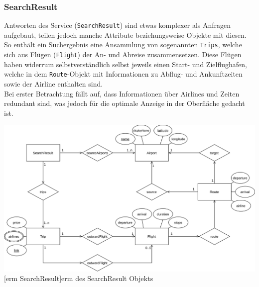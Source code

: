 \documentclass[12pt,twoside,a4paper]{article}
\begin{document}
\subsubsection{SearchResult}
Antworten des Service (\texttt{SearchResult}) sind etwas komplexer als Anfragen aufgebaut, teilen jedoch manche Attribute beziehungsweise Objekte mit diesen. So enthält ein Suchergebnis eine Ansammlung von sogenannten \texttt{Trips}, welche sich aus Flügen (\texttt{Flight}) der An- und Abreise zusammensetzen. Diese Flügen haben widerrum selbstverständlich selbst jeweils einen Start- und Zielflughafen, welche in dem \texttt{Route}-Objekt mit Informationen zu Abflug- und Ankunftzeiten sowie der Airline enthalten sind.\\
Bei erster Betrachtung fällt auf, dass Informationen über Airlines und Zeiten redundant sind, was jedoch für die optimale Anzeige in der Oberfläche gedacht ist.
\begin{center}
	\captionsetup{type=figure}
	\includegraphics[width=\textwidth]{images/datamodel-SearchResult}
	[\acrshort{erm} SearchResult]{\acrlong{erm} des SearchResult Objekts}
\end{center}
\newpage
\end{document}
